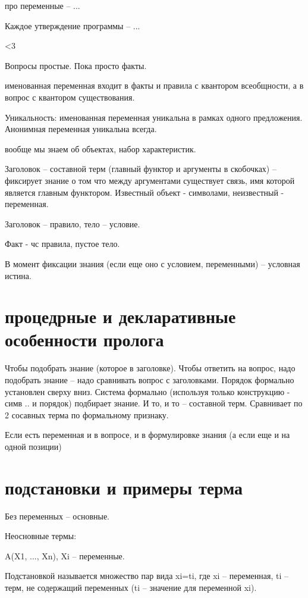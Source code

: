 \documentclass[12pt]{report}
\begin{document}
про переменные -- ...

Каждое утверждение программы -- ...

<3


Вопросы простые. Пока просто факты.

именованная переменная входит в факты и правила с квантором всеобщности, а в вопрос с квантором существования.

Уникальность: именованная переменная уникальна в рамках одного предложения. Анонимная переменная уникальна всегда.

вообще мы знаем об объектах, набор характеристик.

Заголовок -- составной терм (главный функтор и аргументы в скобочках) -- фиксирует знание о том что между аргументами существует связь, имя которой является главным функтором. Известный объект - символами, неизвестный - переменная.

Заголовок -- правило, тело -- условие.

Факт - чс правила, пустое тело.

В  момент фиксации знания (если еще оно с условием, переменными)  --  условная истина.

\section*{процедрные и декларативные особенности пролога}

Чтобы подобрать знание (которое в заголовке). Чтобы ответить на вопрос, надо подобрать знание --  надо сравнивать вопрос с заголовками. Порядок формально установлен  сверху вниз. Система формально (используя только конструкцию - симв .. и порядок) подбирает знание. И то, и то -- составной терм. Сравнивает по 2  сосавных терма по формальному признаку.

Если есть переменная и в вопросе, и в формулировке знания (а если еще и на одной позиции)




\section*{подстановки и примеры терма}

Без переменных -- основные.

Неосновные термы:

A(X1, ..., Xn), Xi -- переменные.

Подстановкой называется множество пар  вида {xi=ti}, где xi -- переменная, ti  -- терм, не содержащий переменных (ti -- значение для переменной xi).
\end{document}
